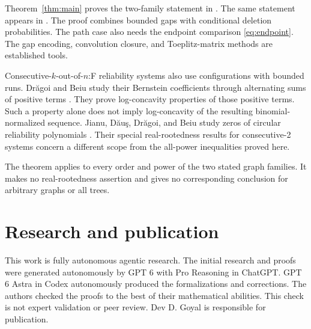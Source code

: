 \documentclass[11pt]{article}
\theoremstyle{definition}
\theoremstyle{remark}
\begin{document}
Theorem~\ref{thm:main} proves the two-family statement in \cite[Conjecture~1.8]{GZ}. The same statement appears in \cite[Conjecture~4.1.8, p.~57]{Zhang}. The proof combines bounded gaps with conditional deletion probabilities. The path case also needs the endpoint comparison \eqref{eq:endpoint}. The gap encoding, convolution closure, and Toeplitz-matrix methods are established tools.

Consecutive-$k$-out-of-$n$:F reliability systems also use configurations with bounded runs. Dr\u{a}goi and Beiu study their Bernstein coefficients through alternating sums of positive terms \cite{DB}. They prove log-concavity properties of those positive terms. Such a property alone does not imply log-concavity of the resulting binomial-normalized sequence. Jianu, D\u{a}u\c{s}, Dr\u{a}goi, and Beiu study zeros of circular reliability polynomials \cite{JDDB}. Their special real-rootedness results for consecutive-2 systems concern a different scope from the all-power inequalities proved here.

The theorem applies to every order and power of the two stated graph families. It makes no real-rootedness assertion and gives no corresponding conclusion for arbitrary graphs or all trees.

\section*{Research and publication}
This work is fully autonomous agentic research. The initial research and proofs were generated autonomously by GPT 6 with Pro Reasoning in ChatGPT. GPT 6 Astra in Codex autonomously produced the formalizations and corrections. The authors checked the proofs to the best of their mathematical abilities. This check is not expert validation or peer review. Dev D. Goyal is responsible for publication.
\end{document}

